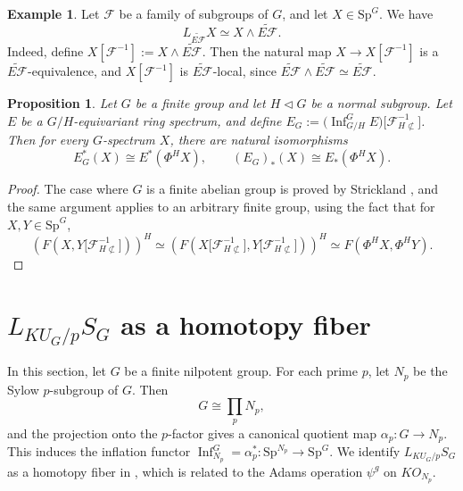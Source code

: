 \documentclass{amsart}
\theoremstyle{plain}
\newtheorem{proposition}[theorem]{Proposition}
\theoremstyle{definition}
\newtheorem{example}[theorem]{Example}
\theoremstyle{remark}
\begin{document}
\begin{example}
    Let $\mathcal{F}$ be a family of subgroups of $G$, and let $X \in \mathrm{Sp}^G$. We have 
    \[
    L_{\widetilde{E\mathcal{F}}}X\simeq X \wedge \widetilde{E\mathcal{F}}.
    \]
    Indeed, define
$X[\mathcal{F}^{-1}] := X \wedge \widetilde{E\mathcal{F}}$.
Then the natural map $X\to X[\mathcal{F}^{-1}]$ is a $\widetilde{E\mathcal{F}}$-equivalence, and $X[\mathcal{F}^{-1}]$ is $\widetilde{E\mathcal{F}}$-local, since $\widetilde{E\mathcal{F}}\wedge \widetilde{E\mathcal{F}}\simeq \widetilde{E\mathcal{F}}$. 
\end{example}

\begin{proposition}\label{prop:pushout type}
    Let $G$ be a finite group and let $H\triangleleft G$ be a normal subgroup. Let $E$ be a $G/H$-equivariant ring spectrum, and define $E_G := \bigl(\operatorname{Inf}^{G}_{G/H} E\bigr)\bigl[\mathcal{F}_{H\not\subset}^{-1}\bigr]$. Then for every $G$-spectrum $X$, there are natural isomorphisms
    \[
    E_G^{*}(X)\cong E^{*}(\Phi^{H}X), \qquad (E_G)_{*}(X)\cong E_{*}(\Phi^{H}X).
    \]
\end{proposition}
\begin{proof}
    The case where $G$ is a finite abelian group is proved by Strickland \cite[Theorem 10.3]{strickland2011multicurves}, and the same argument applies to an arbitrary finite group, using the fact that for $X,Y \in \mathrm{Sp}^G$,
    \[
    (F(X, Y[\mathcal{F}_{H\not\subset}^{-1}\bigr]))^H \simeq (F(X[\mathcal{F}_{H\not\subset}^{-1}\bigr],Y[\mathcal{F}_{H\not\subset}^{-1}\bigr]))^H \simeq F(\Phi^H X, \Phi^H Y).
    \]
\end{proof}







\section{$L_{KU_G/p}S_G$ as a homotopy fiber}\label{Sec: KU/p local sphere}
In this section, let $G$ be a finite nilpotent group. For each prime $p$, let $N_p$ be the Sylow $p$-subgroup of $G$. Then $$G\cong \prod_p N_p,$$ and the projection onto the $p$-factor gives a canonical quotient map $\alpha_p:G\to N_p$. This induces the inflation functor $\operatorname{Inf}_{N_p}^G=\alpha_p^*:\mathrm{Sp}^{N_p}\to \mathrm{Sp}^G$. We identify $L_{KU_G/p}S_G$ as a homotopy fiber in , which is related to the Adams operation $\psi^g$ on $KO_{N_p}$.
\end{document}
